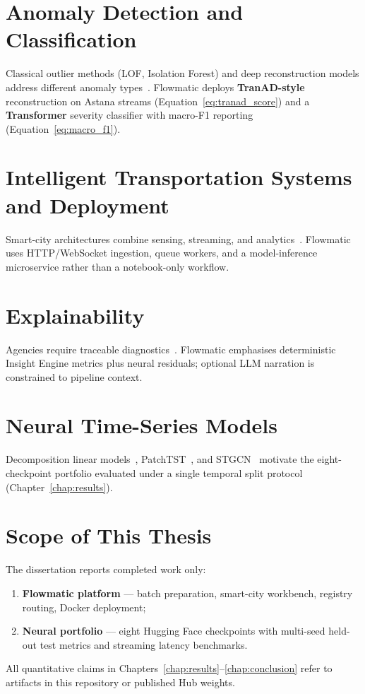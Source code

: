 \section{Anomaly Detection and Classification}

Classical outlier methods (LOF, Isolation Forest) and deep reconstruction models address different anomaly types~\cite{breunig2000lof,liu2008isolation,pang2021deep,ding2024variational}. Flowmatic deploys \textbf{TranAD-style} reconstruction on Astana streams (Equation~\ref{eq:tranad_score}) and a \textbf{Transformer} severity classifier with macro-F1 reporting (Equation~\ref{eq:macro_f1}).

\section{Intelligent Transportation Systems and Deployment}

Smart-city architectures combine sensing, streaming, and analytics~\cite{zanella2014iot,its_bigdata2018,event_driven2025}. Flowmatic uses HTTP/WebSocket ingestion, queue workers, and a model-inference microservice rather than a notebook-only workflow.

\section{Explainability}

Agencies require traceable diagnostics~\cite{lundberg2017unified,lipton2018mythos}. Flowmatic emphasises deterministic Insight Engine metrics plus neural residuals; optional LLM narration is constrained to pipeline context.

\section{Neural Time-Series Models}

Decomposition linear models~\cite{zeng2023transformers}, PatchTST~\cite{nie2023patchtst}, and STGCN~\cite{yu2018stgcn} motivate the eight-checkpoint portfolio evaluated under a single temporal split protocol (Chapter~\ref{chap:results}).

\section{Scope of This Thesis}

The dissertation reports completed work only:
\begin{enumerate}
  \item \textbf{Flowmatic platform} --- batch preparation, smart-city workbench, registry routing, Docker deployment;
  \item \textbf{Neural portfolio} --- eight Hugging Face checkpoints with multi-seed held-out test metrics and streaming latency benchmarks.
\end{enumerate}
All quantitative claims in Chapters~\ref{chap:results}--\ref{chap:conclusion} refer to artifacts in this repository or published Hub weights.
